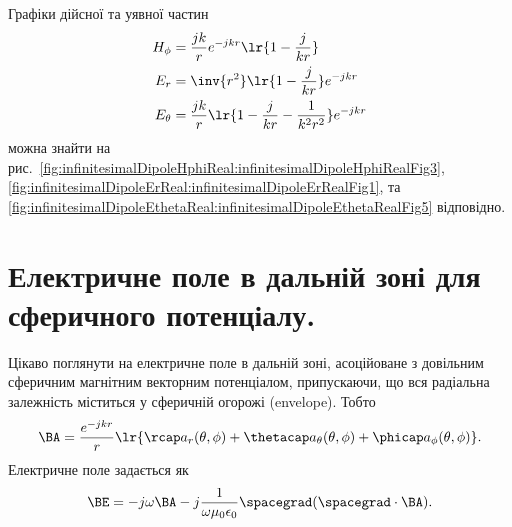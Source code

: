 Графіки дійсної та уявної частин
\begin{equation}\label{eqn:chapter4Notes:69}
\begin{aligned}
H_\phi &= \frac{j k}{r} e^{-j k r} \lr{1 - \frac{j}{k r}} \\
E_r &= \inv{r^2} \lr{1 - \frac{j}{k r}} e^{-j k r} \\
E_\theta &= \frac{j k}{r} \lr{1 - \frac{j}{k r} - \frac{1}{k^2 r^2}} e^{-j k r}
\end{aligned}
\end{equation}
можна знайти на рис.~\cref{fig:infinitesimalDipoleHphiReal:infinitesimalDipoleHphiRealFig3}, \cref{fig:infinitesimalDipoleErReal:infinitesimalDipoleErRealFig1}, та \cref{fig:infinitesimalDipoleEthetaReal:infinitesimalDipoleEthetaRealFig5} відповідно.

\section{Електричне поле в дальній зоні для сферичного потенціалу.}
Цікаво поглянути на електричне поле в дальній зоні, асоційоване з довільним сферичним магнітним векторним потенціалом, припускаючи, що вся радіальна залежність міститься у сферичній огорожі (envelope). Тобто
\begin{equation}\label{eqn:chapter4Notes:20}
\BA = \frac{e^{-j k r}}{r} \lr{
\rcap a_r(\theta, \phi)
+ \thetacap a_\theta(\theta, \phi)
+ \phicap a_\phi(\theta, \phi)
}.
\end{equation}
Електричне поле задається як
\begin{equation}\label{eqn:chapter4Notes:40}
\BE = -j \omega \BA - j \frac{1}{\omega \mu_0 \epsilon_0} \spacegrad (\spacegrad \cdot \BA).
\end{equation}

